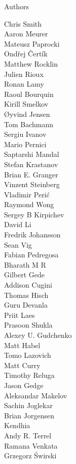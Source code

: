 \documentclass[xcolor=svgnames]{beamer}
\begin{document}
\begin{frame}{Authors}
\begin{multicols}{5}
\tiny
Chris Smith\\
Aaron Meurer\\
Mateusz Paprocki\\
Ondřej Čertík\\
Matthew Rocklin\\
Julien Rioux\\
Ronan Lamy\\
Raoul Bourquin\\
Kirill Smelkov\\
Øyvind Jensen\\
Tom Bachmann\\
Sergiu Ivanov\\
Mario Pernici\\
Saptarshi Mandal\\
Stefan Krastanov\\
Brian E. Granger\\
Vinzent Steinberg\\
Vladimir Perić\\
Raymond Wong\\
Sergey B Kirpichev\\
David Li\\
Fredrik Johansson\\
Sean Vig\\
Fabian Pedregosa\\
Bharath M R\\
Gilbert Gede\\
Addison Cugini\\
Thomas Hisch\\
Guru Devanla\\
Priit Laes\\
Prasoon Shukla\\
Alexey U. Gudchenko\\
Matt Habel\\
Tomo Lazovich\\
Matt Curry\\
Timothy Reluga\\
Jason Gedge\\
Aleksandar Makelov\\
Sachin Joglekar\\
Brian Jorgensen\\
Kendhia\\
Andy R. Terrel\\
Ramana Venkata\\
Grzegorz Świrski\\

\end{multicols}
\end{frame}
\end{document}
